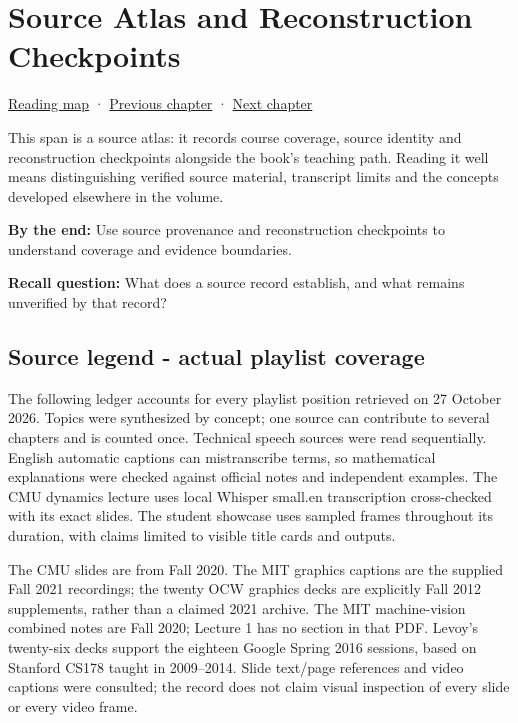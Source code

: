 \hypertarget{04-visual-computing-ii-ch036}{}
\chapter{Source Atlas and Reconstruction Checkpoints}\label{04-visual-computing-ii-ch036-source-atlas-and-reconstruction-checkpoints}

\hyperref[volume-reading-map]{Reading map} · \hyperref[04-visual-computing-ii-ch035-a-complete-renderer-as-an-executable-forward-model]{Previous chapter} · \hyperref[04-visual-computing-ii-ch037-gaussian-splatting-and-editable-captured-worlds]{Next chapter}

This span is a source atlas: it records course coverage, source identity and reconstruction checkpoints alongside the book's teaching path. Reading it well means distinguishing verified source material, transcript limits and the concepts developed elsewhere in the volume.

\textbf{By the end:} Use source provenance and reconstruction checkpoints to understand coverage and evidence boundaries.

\textbf{Recall question:} What does a source record establish, and what remains unverified by that record?

\section{Source legend - actual playlist coverage}\label{04-visual-computing-ii-ch036-source-legend---actual-playlist-coverage}

The following ledger accounts for every playlist position retrieved on 27 October 2026. Topics were synthesized by concept; one source can contribute to several chapters and is counted once. Technical speech sources were read sequentially. English automatic captions can mistranscribe terms, so mathematical explanations were checked against official notes and independent examples. The CMU dynamics lecture uses local Whisper small.en transcription cross-checked with its exact slides. The student showcase uses sampled frames throughout its duration, with claims limited to visible title cards and outputs.

The CMU slides are from Fall 2020. The MIT graphics captions are the supplied Fall 2021 recordings; the twenty OCW graphics decks are explicitly Fall 2012 supplements, rather than a claimed 2021 archive. The MIT machine-vision combined notes are Fall 2020; Lecture 1 has no section in that PDF. Levoy's twenty-six decks support the eighteen Google Spring 2016 sessions, based on Stanford CS178 taught in 2009--2014. Slide text/page references and video captions were consulted; the record does not claim visual inspection of every slide or every video frame.

